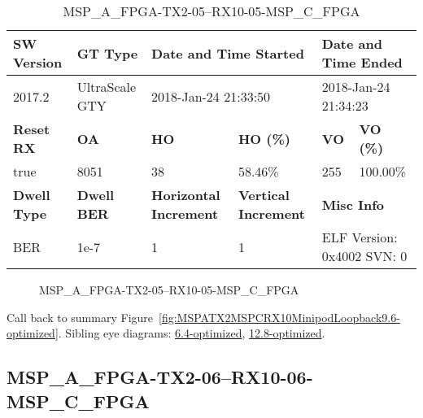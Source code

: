 \begin{table}[h]
\centering
\caption{MSP\_A\_FPGA-TX2-05--RX10-05-MSP\_C\_FPGA}
\label{tab:MSPAFPGATX205RX1005MSPCFPGA9.6-optimized}
\begin{tabular}{@{}|l|l|l|l|l|l|@{}}
\toprule
\textbf{SW Version}                & \textbf{GT Type}   & \multicolumn{2}{l|}{\textbf{Date and Time Started}}            & \multicolumn{2}{l|}{\textbf{Date and Time Ended}}        \\ \midrule
2017.2                       & UltraScale GTY          & \multicolumn{2}{l|}{2018-Jan-24 21:33:50}                   & \multicolumn{2}{l|}{2018-Jan-24 21:34:23}               \\ \midrule
\textbf{Reset RX}                  & \textbf{OA} & \textbf{HO}   & \textbf{HO (\%)} & \textbf{VO} & \textbf{VO (\%)} \\ \midrule
true & 8051        & 38          & 58.46\%        & 255        & 100.00\%       \\ \midrule
\textbf{Dwell Type}                & \textbf{Dwell BER} & \textbf{Horizontal Increment} & \textbf{Vertical Increment}    & \multicolumn{2}{l|}{\textbf{Misc Info}}                  \\ \midrule
BER                            & 1e-7        & 1        & 1           & \multicolumn{2}{l|}{ELF Version: 0x4002 SVN: 0}                         \\ \bottomrule
\end{tabular}
\end{table}

\begin{figure}[h]
\caption{MSP\_A\_FPGA-TX2-05--RX10-05-MSP\_C\_FPGA} \label{fig:MSPAFPGATX205RX1005MSPCFPGA9.6-optimized}
\end{figure}

Call back to summary Figure~\ref{fig:MSPATX2MSPCRX10MinipodLoopback9.6-optimized}.
Sibling eye diagrams: \hyperref[sec:MSPAFPGATX205RX1005MSPCFPGA6.4-optimized]{6.4-optimized}, \hyperref[sec:MSPAFPGATX205RX1005MSPCFPGA12.8-optimized]{12.8-optimized}.

\clearpage
\newpage


\subsection{MSP\_A\_FPGA-TX2-06--RX10-06-MSP\_C\_FPGA}\label{sec:MSPAFPGATX206RX1006MSPCFPGA9.6-optimized}

